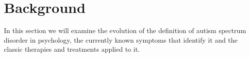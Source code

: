 \chapter{Background}
\label{chapter2}
\ifpdf
    \graphicspath{{Chapter2/Figs/Raster/}{Chapter2/Figs/PDF/}{Chapter2/Figs/}}
\else
    \graphicspath{{Chapter2/Figs/Vector/}{Chapter2/Figs/}}
\fi
In this section we will examine the evolution of the definition of autism spectrum disorder in psychology, the currently known symptoms that identify it and the classic therapies and treatments applied to it.

